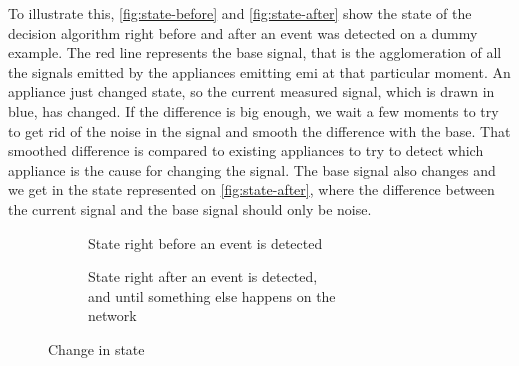 To illustrate this, \autoref{fig:state-before} and \autoref{fig:state-after} show the state of the decision algorithm right before and after an event was detected on a dummy example. The red line represents the base signal, that is the agglomeration of all the signals emitted by the appliances emitting \acrshort{emi} at that particular moment. An appliance just changed state, so the current measured signal, which is drawn in blue, has changed. If the difference is big enough, we wait a few moments to try to get rid of the noise in the signal and smooth the difference with the base. That smoothed difference is compared to existing appliances to try to detect which appliance is the cause for changing the signal. The base signal also changes and we get in the state represented on \autoref{fig:state-after}, where the difference between the current signal and the base signal should only be noise.

\begin{figure}
\begin{subfigure}[t]{0.49\textwidth}
    \centering
    \caption{State right before an event is detected\\}
    \label{fig:state-before}
\end{subfigure}
\begin{subfigure}[t]{0.49\textwidth}
    \centering
    \caption{State right after an event is detected,\\ and until something else happens on the \\network}
    \label{fig:state-after}
\end{subfigure}
\caption{Change in state}
\label{fig:change-state}
\end{figure}





